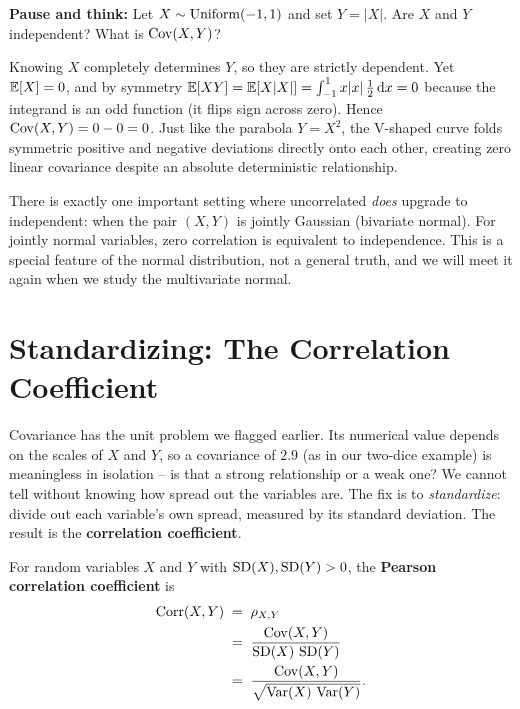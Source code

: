 \begin{recoverybox}
\textbf{Pause and think:} Let $X \sim \operatorname{Uniform}(-1, 1)$ and set $Y = |X|$. Are $X$ and $Y$ independent? What is $\operatorname{Cov}(X, Y)$?

Knowing $X$ completely determines $Y$, so they are strictly dependent. Yet $\operatorname{\mathbb{E}}[X] = 0$, and by symmetry $\operatorname{\mathbb{E}}[XY] = \operatorname{\mathbb{E}}[X|X|] = \int_{-1}^1 x|x|\,\tfrac{1}{2}\,\mathrm{d} x = 0$ because the integrand is an odd function (it flips sign across zero). Hence $\operatorname{Cov}(X, Y) = 0 - 0 = 0$. Just like the parabola $Y = X^2$, the V-shaped curve folds symmetric positive and negative deviations directly onto each other, creating zero linear covariance despite an absolute deterministic relationship.
\end{recoverybox}

There is exactly one important setting where uncorrelated \emph{does} upgrade to
independent: when the pair $(X, Y)$ is jointly Gaussian (bivariate normal). For
jointly normal variables, zero correlation is equivalent to independence. This is a
special feature of the normal distribution, not a general truth, and we will meet it
again when we study the multivariate normal.

\section{Standardizing: The Correlation Coefficient}
\label{ch14:correlation}

Covariance has the unit problem we flagged earlier. Its numerical value depends on
the scales of $X$ and $Y$, so a covariance of $2.9$ (as in our two-dice example)
is meaningless in isolation -- is that a strong relationship or a weak one? We
cannot tell without knowing how spread out the variables are. The fix is to
\emph{standardize}: divide out each variable's own spread, measured by its standard
deviation. The result is the \textbf{correlation coefficient}.

\begin{definition}
\label{ch14:def-corr}
For random variables $X$ and $Y$ with $\operatorname{SD}(X), \operatorname{SD}(Y) > 0$, the \textbf{Pearson
correlation coefficient} is
\begin{align*}
\operatorname{Corr}(X, Y) \;&=\; \rho_{X,Y} \\
\;&=\; \frac{\operatorname{Cov}(X, Y)}{\operatorname{SD}(X)\,\operatorname{SD}(Y)} \\
\;&=\; \frac{\operatorname{Cov}(X, Y)}{\sqrt{\operatorname{Var}(X)\,\operatorname{Var}(Y)}}.
\end{align*}
\end{definition}

